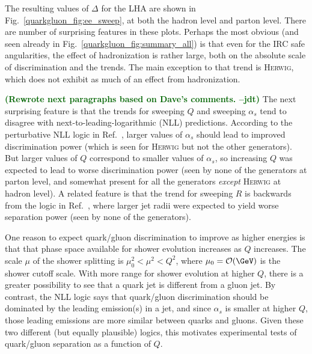 \documentclass[11pt]{cernrep}
\newcommand{\jdt}[1]{\textbf{\textcolor{darkgreen}{(#1 --jdt)}}}
\begin{document}
The resulting values of $\Delta$ for the LHA are shown in Fig.~\ref{quarkgluon_fig:ee_sweep}, at both the hadron level and parton level.   There are number of surprising features in these plots.  Perhaps the most obvious (and seen already in Fig.~\ref{quarkgluon_fig:summary_all}) is that even for the IRC safe angularities, the effect of hadronization is rather large, both on the absolute scale of discrimination and the trends.  The main exception to that trend is \textsc{Herwig}, which does not exhibit as much of an effect from hadronization.

\jdt{Rewrote next paragraphs based on Dave's comments.}  The next surprising feature is that the trends for sweeping $Q$ and sweeping $\alpha_s$ tend to disagree with next-to-leading-logarithmic (NLL) predictions.  According to the  perturbative NLL logic in Ref.~\cite{Larkoski:2013eya}, larger values of $\alpha_s$ should lead to improved discrimination power (which is seen for \textsc{Herwig} but not the other generators).  But larger values of $Q$ correspond to smaller values of $\alpha_s$, so increasing $Q$ was expected to lead to worse discrimination power (seen by none of the generators at parton level, and somewhat present for all the generators \emph{except} \textsc{Herwig} at hadron level).  A related feature is that the trend for sweeping $R$ is backwards from the logic in Ref.~\cite{Larkoski:2013eya}, where larger jet radii were expected to yield worse separation power (seen by none of the generators).

One reason to expect quark/gluon discrimination to improve as higher energies is that that phase space available for shower evolution increases as $Q$ increases.  The scale $\mu$ of the shower splitting is $\mu_0^2 < \mu^2 < Q^2$, where $\mu_0 = \mathcal{O}(\GeV)$ is the shower cutoff scale.  With more range for shower evolution at higher $Q$, there is a greater possibility to see that a quark jet is different from a gluon jet.  By contrast, the NLL logic says that quark/gluon discrimination should be dominated by the leading emission(s) in a jet, and since $\alpha_s$ is smaller at higher $Q$, those leading emissions are more similar between quarks and gluons.  Given these two different (but equally plausible) logics, this motivates experimental tests of quark/gluon separation as a function of $Q$.
\end{document}
